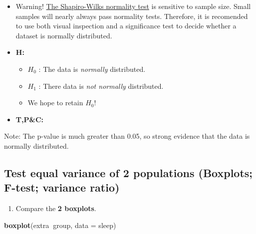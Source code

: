 \documentclass[]{article}
\newenvironment{Shaded}{\begin{snugshade}}{\end{snugshade}}
\newcommand{\DataTypeTok}[1]{\textcolor[rgb]{0.13,0.29,0.53}{#1}}
\newcommand{\KeywordTok}[1]{\textcolor[rgb]{0.13,0.29,0.53}{\textbf{#1}}}
\newcommand{\NormalTok}[1]{#1}
\newcommand{\OperatorTok}[1]{\textcolor[rgb]{0.81,0.36,0.00}{\textbf{#1}}}
\providecommand{\tightlist}{%
  \setlength{\itemsep}{0pt}\setlength{\parskip}{0pt}}
\begin{document}
\begin{itemize}
\item
  Warning! \href{https://academic.oup.com/biomet/article-abstract/52/3-4/591/336553?redirectedFrom=fulltext}{The Shapiro-Wilks normality test} is sensitive to sample size. Small samples will nearly always pass normality tests. Therefore, it is recomended to use both visual inspection and a significance test to decide whether a dataset is normally distributed.
\item
  \textbf{H:}

  \begin{itemize}
  \tightlist
  \item
    \(H_{0}\) : The data is \emph{normally} distributed.
  \item
    \(H_{1}\) : There data is \emph{not normally} distributed.
  \item
    We hope to retain \(H_{0}\)!
  \end{itemize}
\item
  \textbf{T,P\&C:}
\end{itemize}

\begin{Shaded}
\end{Shaded}

Note: The p-value is much greater than 0.05, so strong evidence that the data is normally distributed.

\hypertarget{test-equal-variance-of-2-populations-boxplots-f-test-variance-ratio}{%
\subsection{Test equal variance of 2 populations (Boxplots; F-test; variance ratio)}\label{test-equal-variance-of-2-populations-boxplots-f-test-variance-ratio}}

\begin{enumerate}
\def\labelenumi{(\arabic{enumi})}
\tightlist
\item
  Compare the \textbf{2 boxplots}.
\end{enumerate}

\begin{Shaded}
\begin{Highlighting}[]
\KeywordTok{boxplot}\NormalTok{(extra}\OperatorTok{~}\NormalTok{group, }\DataTypeTok{data =}\NormalTok{ sleep)}
\end{Highlighting}
\end{Shaded}
\end{document}
